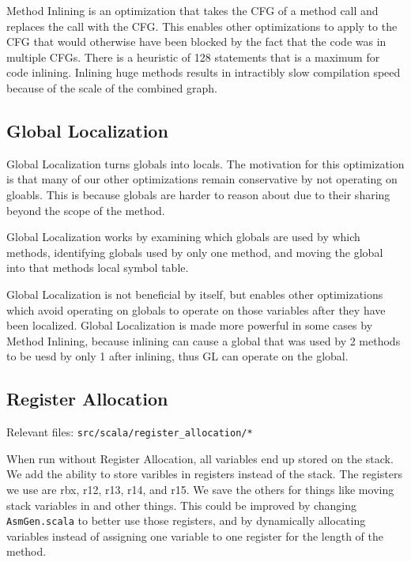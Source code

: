 \documentclass[11pt]{article}
\begin{document}
  Method Inlining is an optimization that takes the CFG of a method call and replaces the call with the CFG.
  This enables other optimizations to apply to the CFG that would otherwise have been blocked by the fact
  that the code was in multiple CFGs.
  There is a heuristic of 128 statements that is a maximum for code inlining. Inlining huge methods
  results in intractibly slow compilation speed because of the scale of the combined graph.


\subsection{Global Localization}
\label{sec-2.8}


  Global Localization turns globals into locals.
  The motivation for this optimization is that many of our other optimizations remain conservative
  by not operating on gloabls. This is because globals are harder to reason about due to their
  sharing beyond the scope of the method.

  Global Localization works by examining which globals are used by which methods, identifying
  globals used by only one method, and moving the global into that methods local symbol table.

  Global Localization is not beneficial by itself, but enables other optimizations which avoid
  operating on globals to operate on those variables after they have been localized.
  Global Localization is made more powerful in some cases by Method Inlining, because inlining
  can cause a global that was used by 2 methods to be uesd by only 1 after inlining, thus GL can operate on the global.


\subsection{Register Allocation}
\label{sec-2.9}

  Relevant files: \texttt{src/scala/register\_allocation/*}

  When run without Register Allocation, all variables end up stored on the stack. 
  We add the ability to store varibles in registers instead of the stack. The registers we use are
  rbx, r12, r13, r14, and r15. We save the others for things like moving stack variables in and other
  things. This could be improved by changing \texttt{AsmGen.scala} to better use those registers, and by
  dynamically allocating variables instead of assigning one variable to one register for the length of
  the method.
\end{document}
